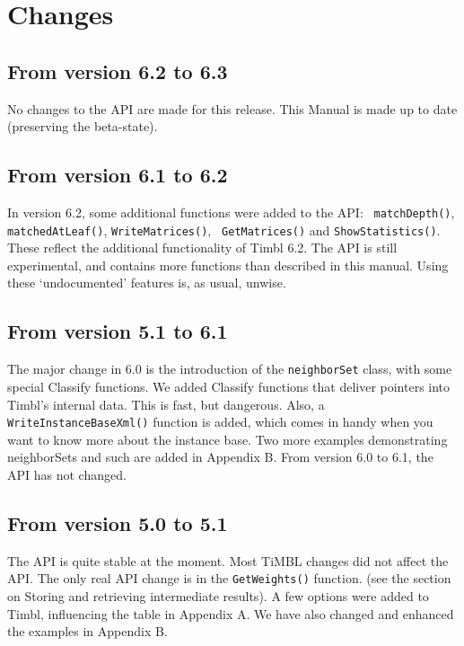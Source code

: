\documentclass{report}
\begin{document}
\chapter{Changes}
\label{changes}

\section{From version 6.2 to 6.3}

No changes to the API are made for this release. This Manual is made
up to date (preserving the beta-state).
 
\section{From version 6.1 to 6.2}

In version 6.2, some additional functions were added to the API: {\tt
  matchDepth()}, {\tt matchedAtLeaf()}, {\tt WriteMatrices()}, {\tt
  GetMatrices()} and {\tt ShowStatistics()}. These reflect the
additional functionality of Timbl 6.2.  The API is still experimental,
and contains more functions than described in this manual. Using these
`undocumented' features is, as usual, unwise.

\section{From version 5.1 to 6.1}

The major change in 6.0 is the introduction of the {\tt neighborSet}
class, with some special Classify functions.  We added Classify
functions that deliver pointers into Timbl's internal data. This is
fast, but dangerous.  Also, a {\tt WriteInstanceBaseXml()} function is
added, which comes in handy when you want to know more about the
instance base.  Two more examples demonstrating neighborSets and such
are added in Appendix B. From version 6.0 to 6.1, the API has not changed.

\section{From version 5.0 to 5.1}

The API is quite stable at the moment. Most TiMBL changes did not
affect the API. The only real API change is in the {\tt GetWeights()}
function. (see the section on Storing and retrieving intermediate
results).  A few options were added to Timbl, influencing the table in
Appendix A. We have also changed and enhanced the examples in Appendix
B.
\end{document}
